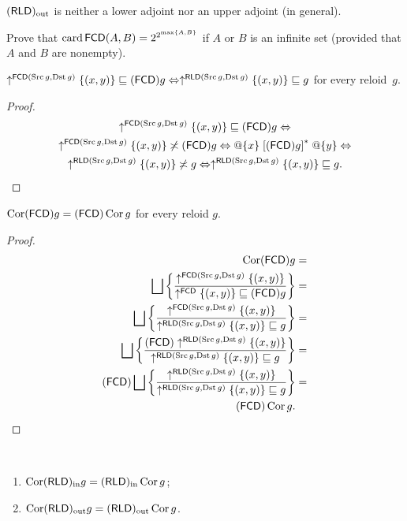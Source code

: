 \begin{conjecture}
$(\mathsf{RLD})_{\mathrm{out}}$ is neither a lower adjoint nor an upper adjoint (in general).\end{conjecture}
\begin{xca}
Prove that $\operatorname{card}\mathsf{FCD}(A,B)=2^{2^{\max\{A,B\}}}$ if $A$ or
$B$ is an infinite set (provided that $A$ and $B$ are nonempty).\end{xca}
\begin{lem}
$\uparrow^{\mathsf{FCD}(\operatorname{Src} g,\operatorname{Dst} g)}\{(x,y)\}\sqsubseteq(\mathsf{FCD}) g\Leftrightarrow\uparrow^{\mathsf{RLD}(\operatorname{Src} g,\operatorname{Dst} g)}\{(x,y)\}\sqsubseteq g$
for every reloid~$g$.\end{lem}
\begin{proof}
~
\begin{multline*}
\uparrow^{\mathsf{FCD}(\operatorname{Src} g,\operatorname{Dst} g)}\{(x,y)\}\sqsubseteq(\mathsf{FCD}) g\Leftrightarrow\\
\uparrow^{\mathsf{FCD}(\operatorname{Src} g,\operatorname{Dst} g)}\{(x,y)\}\not\asymp(\mathsf{FCD}) g\Leftrightarrow @\{x\}\mathrel{\left[(\mathsf{FCD}) g\right]^{\ast}}@\{y\}\Leftrightarrow\\
\uparrow^{\mathsf{RLD}(\operatorname{Src} g,\operatorname{Dst} g)}\{(x,y)\}\not\asymp g\Leftrightarrow\uparrow^{\mathsf{RLD}(\operatorname{Src} g,\operatorname{Dst} g)}\{(x,y)\}\sqsubseteq g.
\end{multline*}
\end{proof}
\begin{thm}
$\operatorname{Cor}(\mathsf{FCD}) g=(\mathsf{FCD})\operatorname{Cor} g$ for every reloid $g$.\end{thm}
\begin{proof}
~
\begin{align*}
\Cor\tofcd g & =\\
\bigsqcup\setcond{\uparrow^{\mathsf{FCD}(\Src g,\Dst g)}\{(x,y)\}}{\uparrow^{\mathsf{FCD}}\{(x,y)\}\sqsubseteq\tofcd g} & =\\
\bigsqcup\setcond{\uparrow^{\mathsf{FCD}(\Src g,\Dst g)}\{(x,y)\}}{\uparrow^{\mathsf{RLD}(\Src g,\Dst g)}\{(x,y)\}\sqsubseteq g} & =\\
\bigsqcup\setcond{\tofcd\uparrow^{\mathsf{RLD}(\Src g,\Dst g)}\{(x,y)\}}{\uparrow^{\mathsf{RLD}(\Src g,\Dst g)}\{(x,y)\}\sqsubseteq g} & =\\
\tofcd\bigsqcup\setcond{\uparrow^{\mathsf{RLD}(\Src g,\Dst g)}\{(x,y)\}}{\uparrow^{\mathsf{RLD}(\Src g,\Dst g)}\{(x,y)\}\sqsubseteq g} & =\\
\tofcd\Cor g.
\end{align*}
\end{proof}
\begin{conjecture}
~
\begin{enumerate}
\item $\operatorname{Cor}(\mathsf{RLD})_{\mathrm{in}} g=(\mathsf{RLD})_{\mathrm{in}}\operatorname{Cor} g$;
\item $\operatorname{Cor}(\mathsf{RLD})_{\mathrm{out}} g=(\mathsf{RLD})_{\mathrm{out}}\operatorname{Cor} g$.
\end{enumerate}
\end{conjecture}

